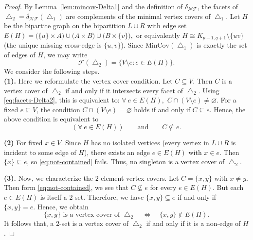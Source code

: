 \documentclass[10pt,a4paper]{amsart}
\newcommand{\F}{\mathcal{F}}
\newcommand{\MIN}{\mathrm{MinCov}}
\begin{document}
		\begin{proof}
			By Lemma~\ref{lem:mincov-Delta1} and the definition of \(\delta_{\mathcal{NF}}\),
			the facets of \(\bigtriangleup_2=\delta_{\mathcal{NF}}(\bigtriangleup_1)\) are complements of the minimal vertex covers of \(\bigtriangleup_1\). Let \(H\) be the bipartite graph on the bipartition \(L\cup R\) with edge set $E(H)=\bigl(\{u\}\times A\bigr) \cup \bigl(A\times B\bigr) \cup \bigl(B\times \{v\}\bigr), $ or equivalently \(H\cong K_{p+1,q+1}\setminus\{uv\}\) (the unique missing cross-edge is \(\{u,v\}\)).
			Since \(\MIN(\bigtriangleup_1)\) is exactly the set of edges of \(H\), we may write
			\begin{equation}\label{eq:facets-Delta2}
				\F(\bigtriangleup_2)=\{ V\setminus e  :  e\in E(H) \}.
			\end{equation}
			We consider the following steps.\\
			\medskip\noindent
			\textbf{(1).} Here we reformulate the vertex cover condition. Let \(C\subseteq V\). Then \(C\) is a vertex cover of \(\bigtriangleup_2\) if and only if it intersects every facet of \(\bigtriangleup_2\). 	Using \eqref{eq:facets-Delta2}, this is equivalent to: $\forall ~e\in E(H),$   $C\cap (V\setminus e)\neq\varnothing.$ 
			For a fixed \(e\subseteq V\), the condition \(C\cap (V\setminus e)=\varnothing\) holds if and only if
			\(C\subseteq e\). Hence, the above condition is equivalent to
			\begin{equation}\label{eq:not-contained}
				(\forall ~e\in E(H))\qquad\text{and}\qquad C\not\subseteq e.
			\end{equation}
			
			\medskip\noindent
			\textbf{(2)}
			For fixed \(x\in V\). Since \(H\) has no isolated vertices (every vertex in \(L\cup R\) is incident to some edge of \(H\)),
			there exists an edge \(e\in E(H)\) with \(x\in e\). Then \(\{x\}\subseteq e\), so \eqref{eq:not-contained} fails.
			Thus, no singleton is a vertex cover of \(\bigtriangleup_2\).
			
			\medskip\noindent
			\textbf{(3).} Now, we characterize the \(2\)-element vertex covers.	Let \(C=\{x,y\}\) with \(x\neq y\). Then form \eqref{eq:not-contained}, we see that \(C\not\subseteq e\) for every \(e\in E(H)\).
			But each \(e\in E(H)\) is itself a \(2\)-set. Therefore, we have
			 $\{x,y\}\subseteq e$  if and only if $ \{x,y\}=e.$ 	Hence, we obtain
			\begin{equation}\label{eq:2cover-iff-nonedge}
				\{x,y\}\text{ is a vertex cover of }\bigtriangleup_2
				\quad\Longleftrightarrow\quad
				\{x,y\}\notin E(H).
			\end{equation}
			It follows that, a \(2\)-set is a vertex cover of \(\bigtriangleup_2\) if and only if it is a non-edge of \(H\).
			

\end{proof}
\end{document}
